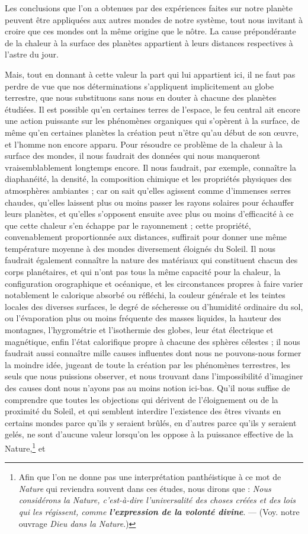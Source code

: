 \documentclass[a4paper, 11pt, oneside]{article}
\begin{document}
Les conclusions que l'on a obtenues par des expériences faites sur notre planète peuvent être appliquées aux autres mondes de notre système, tout nous invitant à croire que ces mondes ont la même origine que le nôtre. La cause prépondérante de la chaleur à la surface des planètes appartient à leurs distances respectives à l'astre du jour.

Mais, tout en donnant à cette valeur la part qui lui appartient ici, il ne faut pas perdre de vue que nos déterminations s'appliquent implicitement au globe terrestre, que nous substituons sans nous en douter à chacune des planètes étudiées. Il est possible qu'en certaines terres de l'espace, le feu central ait encore une action puissante sur les phénomènes organiques qui s'opèrent à la surface, de même qu'en certaines planètes la création peut n'être qu'au début de son œuvre, et l'homme non encore apparu. Pour résoudre ce problème de la chaleur à la surface des mondes, il nous faudrait des données qui nous manqueront vraisemblablement longtemps encore. Il nous faudrait, par exemple, connaître la diaphanéité, la densité, la composition chimique et les propriétés physiques des atmosphères ambiantes ; car on sait qu'elles agissent comme d'immenses serres chaudes, qu'elles laissent plus ou moins passer les rayons solaires pour échauffer leurs planètes, et qu'elles s'opposent ensuite avec plus ou moins d'efficacité à ce que cette chaleur s'en échappe par le rayonnement ; cette propriété, convenablement proportionnée aux distances, suffirait pour donner une même température moyenne à des mondes diversement éloignés du Soleil. Il nous faudrait également connaître la nature des matériaux qui constituent chacun des corps planétaires, et qui n'ont pas tous la même capacité pour la chaleur, la configuration orographique et océanique, et les circonstances propres à faire varier notablement le calorique absorbé ou réfléchi, la couleur générale et les teintes locales des diverses surfaces, le degré de sécheresse ou d'humidité ordinaire du sol, ou l'évaporation plus ou moins fréquente des masses liquides, la hauteur des montagnes, l'hygrométrie et l'isothermie des globes, leur état électrique et magnétique, enfin l'état calorifique propre à chacune des sphères célestes ; il nous faudrait aussi connaître mille causes influentes dont nous ne pouvons-nous former la moindre idée, jugeant de toute la création par les phénomènes terrestres, les seuls que nous puissions observer, et nous trouvant dans l'impossibilité d'imaginer des causes dont nous n'ayons pas au moins notion ici-bas. Qu'il nous suffise de comprendre que toutes les objections qui dérivent de l'éloignement ou de la proximité du Soleil, et qui semblent interdire l'existence des êtres vivants en certains mondes parce qu'ils y seraient brûlés, en d'autres parce qu'ils y seraient gelés, ne sont d'aucune valeur lorsqu'on les oppose à la puissance effective de la Nature,\footnote{Afin que l'on ne donne pas une interprétation panthéistique à ce mot de \emph{Nature} qui reviendra souvent dans ces études, nous dirons que : \emph{Nous considérons la Nature, c'est-à-dire l'universalité des choses créées et des lois qui les régissent, comme \textbf{l'expression de la volonté divine}}. --- (Voy. notre ouvrage \emph{Dieu dans la Nature}.)} et 
\end{document}
